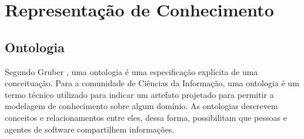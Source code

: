 \section{Representação de Conhecimento} %
\label{sec:representação_de_conhecimento}




\subsection{Ontologia} %
\label{ssub:ontologia}


Segundo Gruber \cite{Gruber93}, uma ontologia é uma especificação explícita de uma conceituação. Para a comunidade de Ciências da Informação, uma ontologia é um termo técnico utilizado para indicar um artefato projetado para permitir a modelagem de conhecimento sobre algum domínio\cite{Gruber08}. As ontologias descrevem conceitos e relacionamentos entre eles, dessa forma, possibilitam que pessoas e agentes de software compartilhem informações.




